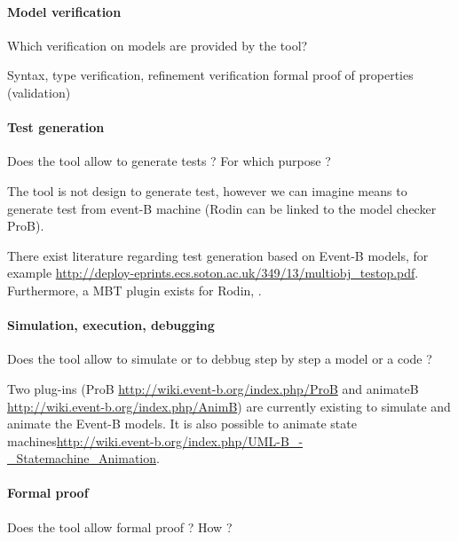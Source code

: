 \paragraph{Model verification}
Which verification on models are provided by the tool?

\begin{author_comment}

Syntax, type verification,
refinement verification
formal proof of properties (validation)
\end{author_comment}

\paragraph{Test generation}
Does the tool allow to generate tests ? For  which purpose ?

\begin{author_comment}

The tool is not design to generate test, however we can imagine means to  generate test from event-B machine (Rodin can be linked to the model checker ProB).
\end{author_comment}

\begin{assessor2}
There exist literature regarding test generation based on Event-B models, for example \url{http://deploy-eprints.ecs.soton.ac.uk/349/13/multiobj_testop.pdf}. Furthermore, a MBT plugin exists for Rodin, .
\end{assessor2}

\paragraph{Simulation, execution, debugging}
Does the tool allow to simulate or to debbug step by step a model or a code ?

\begin{author_comment}

Two plug-ins (ProB \url{http://wiki.event-b.org/index.php/ProB} and animateB \url{http://wiki.event-b.org/index.php/AnimB}) are currently existing to simulate and animate the Event-B models. It is also possible to animate state machines\url{http://wiki.event-b.org/index.php/UML-B_-_Statemachine_Animation}.
\end{author_comment}

\paragraph{Formal proof}
Does the tool allow formal proof ?  How ?

